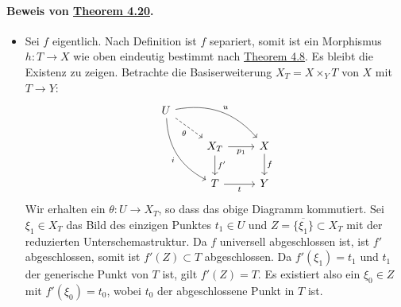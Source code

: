 \paragraph{Beweis von \hyperref[4.20]{Theorem 4.20}.}\begin{itemize}
\item Sei $f$ eigentlich. Nach Definition ist $f$ separiert, somit ist ein Morphismus $h:T\to X$ wie oben eindeutig bestimmt nach \hyperref[4.8]{Theorem 4.8}. Es bleibt die Existenz zu zeigen. Betrachte die Basiserweiterung $X_T=X\times_YT$ von $X$ mit $T\to Y$:
\[\begin{tikzcd}
U \ar[dr, "\theta"', dashed]\ar[rrd, "u", bend left]\ar[ddr, "i"', bend right] &&\\
& X_T\ar[r, "p_1"']\ar[d, "f'"] & X\ar[d, "f"]\\
& T\ar[r, "t"'] & Y
\end{tikzcd} \]
Wir erhalten ein $\theta:U\to X_T$, so dass das obige Diagramm kommutiert. Sei $\xi_1\in X_T$ das Bild des einzigen Punktes $t_1\in U$ und $Z=\overline{\{\xi_1\}}\subset X_T$ mit der reduzierten Unterschemastruktur. Da $f$ universell abgeschlossen ist, ist $f'$ abgeschlossen, somit ist $f'(Z)\subset T$ abgeschlossen. Da $f'(\xi_1)=t_1$ und $t_1$ der generische Punkt von $T$ ist, gilt $f'(Z)=T$. Es existiert also ein $\xi_0\in Z$ mit $f'(\xi_0)=t_0$, wobei $t_0$ der abgeschlossene Punkt in $T$ ist.


\end{itemize}
